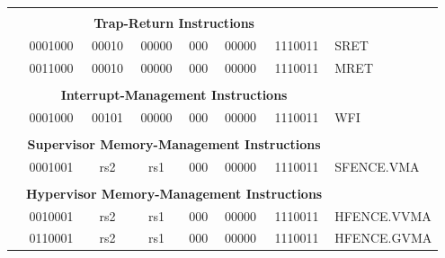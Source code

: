 \documentclass{../runikraft-report}
\begin{document}
{\begin{longtable}{p{0in}p{0.4in}p{0.05in}p{0.05in}p{0.05in}p{0.05in}p{0.4in}p{0.6in}p{0.4in}p{0.6in}p{0.7in}l}
    &
    \multicolumn{10}{c}{} & \\
    &
    \multicolumn{10}{c}{\bf Trap-Return Instructions} & \\
    \cline{2-11}


    &
    \multicolumn{4}{|c|}{0001000} &
    \multicolumn{2}{c|}{00010} &
    \multicolumn{1}{c|}{00000} &
    \multicolumn{1}{c|}{000} &
    \multicolumn{1}{c|}{00000} &
    \multicolumn{1}{c|}{1110011} & SRET \\
    \cline{2-11}


    &
    \multicolumn{4}{|c|}{0011000} &
    \multicolumn{2}{c|}{00010} &
    \multicolumn{1}{c|}{00000} &
    \multicolumn{1}{c|}{000} &
    \multicolumn{1}{c|}{00000} &
    \multicolumn{1}{c|}{1110011} & MRET \\
    \cline{2-11}


    &
    \multicolumn{10}{c}{} & \\
    &
    \multicolumn{10}{c}{\bf Interrupt-Management Instructions} & \\
    \cline{2-11}


    &
    \multicolumn{4}{|c|}{0001000} &
    \multicolumn{2}{c|}{00101} &
    \multicolumn{1}{c|}{00000} &
    \multicolumn{1}{c|}{000} &
    \multicolumn{1}{c|}{00000} &
    \multicolumn{1}{c|}{1110011} & WFI \\
    \cline{2-11}


    &
    \multicolumn{10}{c}{} & \\
    &
    \multicolumn{10}{c}{\bf Supervisor Memory-Management Instructions} & \\
    \cline{2-11}


    &
    \multicolumn{4}{|c|}{0001001} &
    \multicolumn{2}{c|}{rs2} &
    \multicolumn{1}{c|}{rs1} &
    \multicolumn{1}{c|}{000} &
    \multicolumn{1}{c|}{00000} &
    \multicolumn{1}{c|}{1110011} & SFENCE.VMA \\
    \cline{2-11}


    &
    \multicolumn{10}{c}{} & \\
    &
    \multicolumn{10}{c}{\bf Hypervisor Memory-Management Instructions} & \\
    \cline{2-11}


    &
    \multicolumn{4}{|c|}{0010001} &
    \multicolumn{2}{c|}{rs2} &
    \multicolumn{1}{c|}{rs1} &
    \multicolumn{1}{c|}{000} &
    \multicolumn{1}{c|}{00000} &
    \multicolumn{1}{c|}{1110011} & HFENCE.VVMA \\
    \cline{2-11}


    &
    \multicolumn{4}{|c|}{0110001} &
    \multicolumn{2}{c|}{rs2} &
    \multicolumn{1}{c|}{rs1} &
    \multicolumn{1}{c|}{000} &
    \multicolumn{1}{c|}{00000} &
    \multicolumn{1}{c|}{1110011} & HFENCE.GVMA \\
    \cline{2-11}



\end{longtable}}
\end{document}
